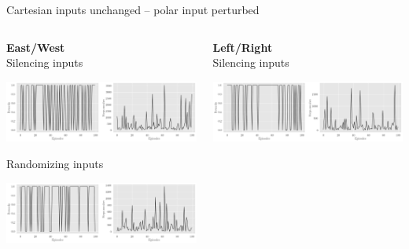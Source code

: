 \documentclass[bigger]{beamer}
\begin{document}
\begin{frame}[label={sec:org5cd39f8}]{Cartesian inputs unchanged -- polar input perturbed}
\begin{columns}
\begin{column}[c]{0.5\columnwidth}
\begin{center}
\small
\textbf{East/West}\\
\footnotesize
Silencing inputs
\end{center}
\begin{center}
\includegraphics[width=\textwidth]{medias/steps-and-rewards-EastWest-perturb-silence.png}
\end{center}
\begin{center}
\footnotesize
Randomizing inputs
\end{center}
\begin{center}
\includegraphics[width=\textwidth]{medias/steps-and-rewards-EastWest-perturb-rand.png}
\end{center}
\end{column}
\begin{column}[c]{0.5\columnwidth}
\begin{center}
\small
\textbf{Left/Right}\\
\footnotesize
Silencing inputs
\end{center}
\begin{center}
\includegraphics[width=\textwidth]{medias/steps-and-rewards-LeftRight-perturb-silence.png}

\end{center}
\end{column}
\end{columns}
\end{frame}
\end{document}
